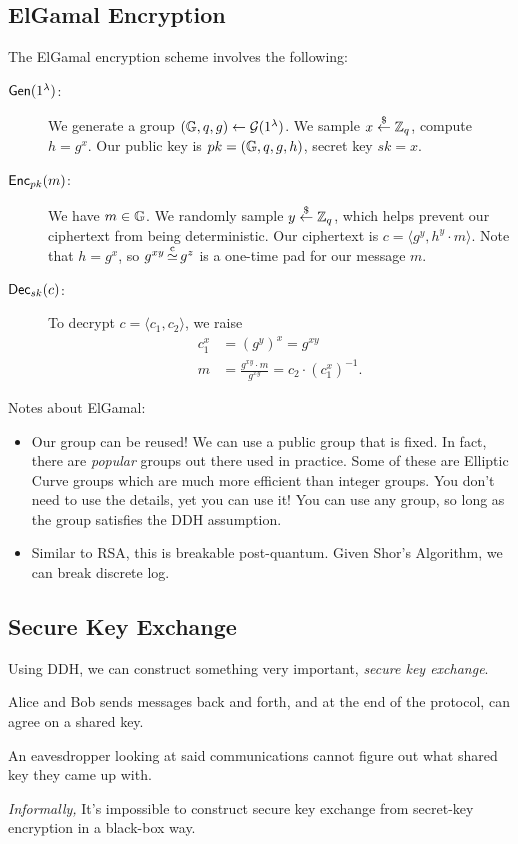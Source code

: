 \subsection{ElGamal Encryption}
The ElGamal encryption scheme involves the following:
\begin{description}
    \item[$\operatorname{\mathsf{Gen}}(1^\lambda)$:] We generate a group $(\mathbb G, q, g) \leftarrow \mathcal{G}(1^\lambda)$. We sample $x\overset{\$}{\leftarrow} \mathbb Z_q$, compute $h = g^x$. Our public key is $pk = (\mathbb G, q, g, h)$, secret key $sk = x$.
    \item[$\operatorname{\mathsf{Enc}}_{pk}(m)$:] We have $m\in\mathbb G$. We randomly sample $y\overset{\$}{\leftarrow} \mathbb Z_q$, which helps prevent our ciphertext from being deterministic. Our ciphertext is $c = \langle g^y, h^y\cdot m\rangle$. Note that $h = g^x$, so $g^{xy}\operatorname{\overset{c}{\simeq}} g^z$ is a one-time pad for our message $m$.
    \item[$\operatorname{\mathsf{Dec}}_{sk}(c)$:] To decrypt $c = \langle c_1, c_2\rangle$, we raise
        \begin{align*}
            c_1^x & = (g^y)^x = g^{xy}                                      \\
            m     & = \frac{g^{xy}\cdot m}{g^{xy}} = c_2\cdot (c_1^x)^{-1}.
        \end{align*}
\end{description}

Notes about ElGamal:
\begin{itemize}
    \item Our group can be reused! We can use a public group that is fixed. In fact, there are \emph{popular} groups out there used in practice. Some of these are Elliptic Curve groups which are much more efficient than integer groups. You don't need to use the details, yet you can use it! You can use any group, so long as the group satisfies the DDH assumption.
    \item Similar to RSA, this is breakable post-quantum. Given Shor's Algorithm, we can break discrete log.
\end{itemize}

\subsection{Secure Key Exchange}
Using DDH, we can construct something very important, \emph{secure key exchange}.
\begin{definition}
    Alice and Bob sends messages back and forth, and at the end of the protocol, can agree on a shared key.

    An eavesdropper looking at said communications cannot figure out what shared key they came up with.
\end{definition}
\begin{theorem}
    \emph{Informally,} It's impossible to construct secure key exchange from secret-key encryption in a black-box way.
\end{theorem}


